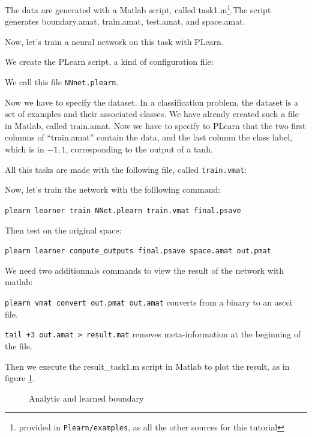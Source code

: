 The data are generated with a Matlab script, called 
task1.m\footnote{provided in \texttt{Plearn/examples}, as all the other sources for this tutorial}.The 
script generates boundary.amat, train.amat, test.amat, and space.amat.
% 

Now, let's train a neural network on this task with PLearn.

We create the PLearn script, a kind of configuration file:


We call this file \texttt{NNnet.plearn}.

Now we have to specify the dataset. In a classification problem, the dataset is 
a set of examples and their associated classes. We have already created such a 
file in Matlab, called train.amat.
Now we have to specify to PLearn that the two first columns of ``train.amat'' 
contain the data, and the last column the class label, which is in ${-1,1}$, 
corresponding to the output of a tanh.

All this tasks are made with the following file, called \texttt{train.vmat}:


Now, let's train the network with the folllowing command:

\texttt{plearn learner train NNet.plearn train.vmat final.psave}

Then test on the original space:

\texttt{plearn learner compute\_outputs final.psave space.amat 
out.pmat}

We need two additionnals commands to view the result of the network with matlab:

\texttt{plearn vmat convert out.pmat out.amat} converts from a binary to an ascci file.

\texttt{tail +3 out.amat > result.mat} removes meta-information at the beginning of the file.

Then we execute the result\_task1.m script in Matlab to plot the result, as in figure 
\ref{df}.\begin{figure}
  \caption{Analytic and learned boundary}  
\label{df}
\end{figure}

